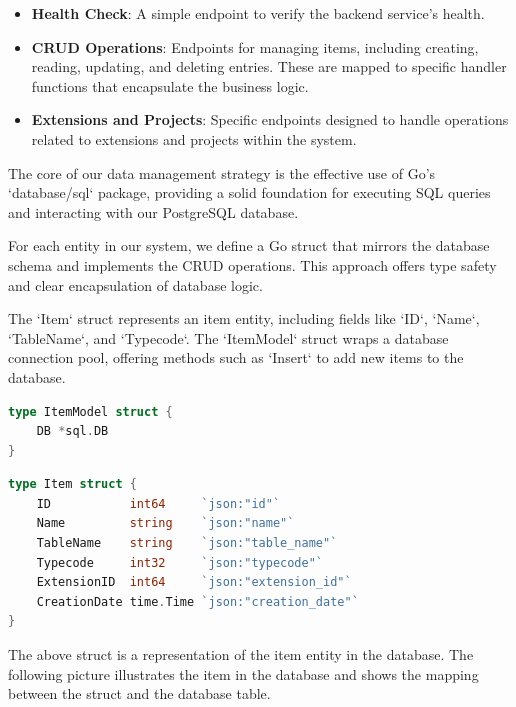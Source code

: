 \begin{itemize}
    \item \textbf{Health Check}: A simple endpoint to verify the backend service's health.
    \item \textbf{CRUD Operations}: Endpoints for managing items, including creating, reading, updating, and deleting entries.
    These are mapped to specific handler functions that encapsulate the business logic.
    \item \textbf{Extensions and Projects}: Specific endpoints designed to handle operations related to extensions and projects within the system.
\end{itemize}

The core of our data management strategy is the effective use of Go's `database/sql` package, providing a solid foundation for executing SQL queries and interacting with our PostgreSQL database.

For each entity in our system, we define a Go struct that mirrors the database schema and implements the CRUD operations.
This approach offers type safety and clear encapsulation of database logic.

The `Item` struct represents an item entity, including fields like `ID`, `Name`, `TableName`, and `Typecode`.
The `ItemModel` struct wraps a database connection pool, offering methods such as `Insert` to add new items to the database.

\begin{lstlisting}[language=Go,label={lst:lstlisting17}]
type ItemModel struct {
	DB *sql.DB
}
\end{lstlisting}

\begin{lstlisting}[language=Go,label={lst:lstlisting2}]
type Item struct {
    ID           int64     `json:"id"`
    Name         string    `json:"name"`
    TableName    string    `json:"table_name"`
    Typecode     int32     `json:"typecode"`
    ExtensionID  int64     `json:"extension_id"`
    CreationDate time.Time `json:"creation_date"`
}
\end{lstlisting}

The above struct is a representation of the item entity in the database.
The following picture illustrates the item in the database and shows the mapping between the struct and the database table.

